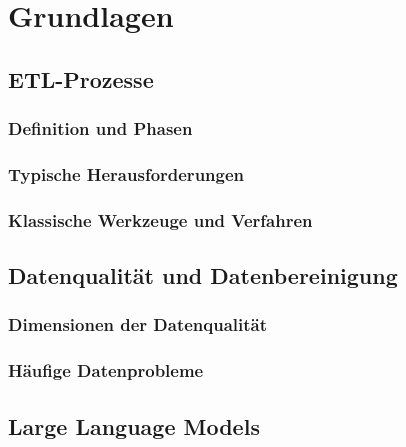 
\chapter{Grundlagen}
\label{ch:grundlagen}

\section{ETL-Prozesse}
\label{sec:etl}

\subsection{Definition und Phasen}
\label{subsec:etl-phasen}

\subsection{Typische Herausforderungen}
\label{subsec:etl-herausforderungen}

\subsection{Klassische Werkzeuge und Verfahren}
\label{subsec:etl-werkzeuge}

\section{Datenqualität und Datenbereinigung}
\label{sec:datenqualitaet}

\subsection{Dimensionen der Datenqualität}
\label{subsec:dq-dimensionen}

\subsection{Häufige Datenprobleme}
\label{subsec:dq-probleme}

\section{Large Language Models}
\label{sec:llm}

